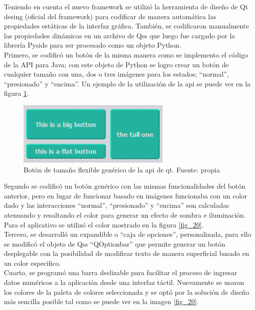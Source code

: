 Teniendo en cuenta el nuevo framework se utilizó la herramienta de diseño de Qt desing (oficial del framework) para codificar de manera automática las propiedades estáticas de la interfaz gráfica. También, se codificaron manualmente las propiedades dinámicas en un archivo de Qss que luego fue cargado por la librería Pyside para ser procesado como un objeto Python. 
\vspace{0.5cm}\\
Primero, se codificó un botón de la misma manera como se implemento el código de la API para Java; con este objeto de Python se logro crear un botón de cualquier tamaño con una, dos o tres imágenes para los estados; ``normal'', ``presionado'' y ``encima''. Un ejemplo de la utilización de la api se puede ver en la figura \ref{fig_19}.
\vspace{0.5cm}\\
\begin{figure}[htbp]
	\centerline{\includegraphics[width=7.5cm]{./figuras/qt_button.png}}
	\caption{Botón de tamaño flexible genérico de la api de qt. Fuente: propia}
	\label{fig_19}
\end{figure}

Segundo se codificó un botón genérico con las mismas funcionalidades del botón anterior, pero en lugar de funcionar basado en imágenes funcionaba con un color dado y las interacciones ``normal'', ``presionado'' y ``encima'' son calculadas atenuando y resaltando el color para generar un efecto de sombra e iluminación. Para el aplicativo se utilizó el color mostrado en la figura \ref{fig_20}.
\vspace{0.5cm}\\
Tercero, se desarrolló un expandible o ``caja de opciones'', personalizada, para ello se modificó el objeto de Qss “QOptionbar” que permite generar un botón desplegable con la posibilidad de modificar texto de manera superficial basado en un color especifico.
\vspace{0.5cm}\\
Cuarto, se programó una barra deslizable para facilitar el proceso de ingresar datos numéricos a la aplicación desde una interfaz táctil. Nuevamente se usaron los colores de la paleta de colores seleccionada y se optó por la solución de diseño más sencilla posible tal como se puede ver en la imagen \ref{fig_20}.

